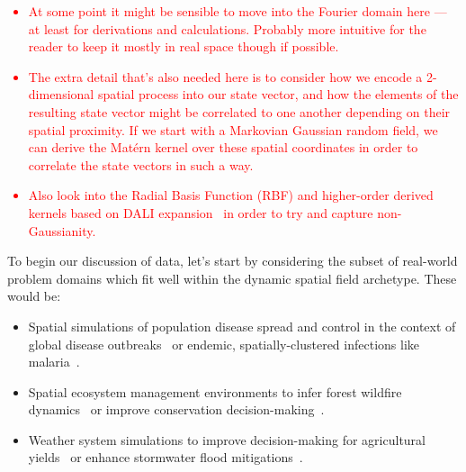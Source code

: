 \textcolor{red}{
\begin{itemize}
\item{At some point it might be sensible to move into the Fourier domain here --- at least for derivations and calculations. Probably more intuitive for the reader to keep it mostly in real space though if possible.} 
\item{The extra detail that's also needed here is to consider how we encode a 2-dimensional spatial process into our state vector, and how the elements of the resulting state vector might be correlated to one another depending on their spatial proximity. If we start with a Markovian Gaussian random field, we can derive the Mat\'{e}rn kernel over these spatial coordinates in order to correlate the state vectors in such a way.} 
\item{Also look into the Radial Basis Function (RBF) and higher-order derived kernels based on DALI expansion~\cite{sellentin2014breaking} in order to try and capture non-Gaussianity.}
\end{itemize}
}

To begin our discussion of data, let's start by considering the subset of real-world problem domains which fit well within the dynamic spatial field archetype. These would be:
\begin{itemize}
\item{Spatial simulations of population disease spread and control in the context of global disease outbreaks~\cite{ohi2020exploring} or endemic, spatially-clustered infections like malaria~\cite{carter2000spatial}.}
\item{Spatial ecosystem management environments to infer forest wildfire dynamics~\cite{ganapathi2018using} or improve conservation decision-making~\cite{lapeyrolerie2022deep}.}
\item{Weather system simulations to improve decision-making for agricultural yields~\cite{chen2021reinforcement} or enhance stormwater flood mitigations~\cite{saliba2020deep}.}
\end{itemize}

